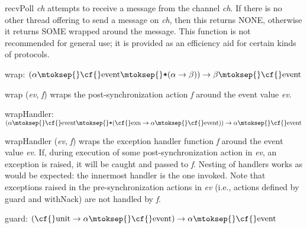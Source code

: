 \begin{descr}
\begin{speccomment}
\item {\cf \small recv\-Poll \mbox{\cf \small \textit{ch}}           } 
attempts to receive a message from the channel \mbox{\cf \small \textit{ch}}. 	  If there is no other thread offering to {\cf \small send} a message 	  on \mbox{\cf \small \textit{ch}}, then this returns 	  {\cf \small NONE}, otherwise it 	  returns {\cf \small SOME} wrapped 	  around the message. 	  This function is not recommended for general use; it is provided 	  as an efficiency aid for certain kinds of protocols.     \end{speccomment}
\item {}{} {\cf wrap: \((\alpha\mtoksep{}\mbox{\cf{}event}\mtoksep{}\verb,*,(\alpha\rightarrow \beta))\rightarrow \beta\mtoksep{}\mbox{\cf{}event}\)}\label{val-CML.wrap}


\begin{speccomment}
\item {\cf \small wrap (\mbox{\cf \small \textit{ev}}, \mbox{\cf \small \textit{f}})           } 
wraps the post-synchronization action \mbox{\cf \small \textit{f}} around the event 	  value \mbox{\cf \small \textit{ev}}.     \end{speccomment}
\item {}{} {\cf wrapHandler: \((\alpha\mtoksep{}\mbox{\cf{}event}\mtoksep{}\verb,*,(\mbox{\cf{}exn}\rightarrow \alpha\mtoksep{}\mbox{\cf{}event}))\rightarrow \alpha\mtoksep{}\mbox{\cf{}event}\)}\label{val-CML.wrapHandler}


\begin{speccomment}
\item {\cf \small wrap\-Handler (\mbox{\cf \small \textit{ev}}, \mbox{\cf \small \textit{f}})           } 
wraps the exception handler function \mbox{\cf \small \textit{f}} around the event 	  value \mbox{\cf \small \textit{ev}}. 	  If, during execution of some post-synchronization action in 	  \mbox{\cf \small \textit{ev}}, an exception is raised, it will be caught and passed 	  to \mbox{\cf \small \textit{f}}. 	  Nesting of handlers works as would be expected: the innermost 	  handler is the one invoked. 	  Note that exceptions raised in the pre-synchronization actions in 	  \mbox{\cf \small \textit{ev}} (i.\-e., actions defined by {\cf \small guard} and {\cf \small with\-Nack}) 	  are not handled by \mbox{\cf \small \textit{f}}.     \end{speccomment}
\item {}{} {\cf guard: \((\mbox{\cf{}unit}\rightarrow \alpha\mtoksep{}\mbox{\cf{}event})\rightarrow \alpha\mtoksep{}\mbox{\cf{}event}\)}\label{val-CML.guard}



\end{descr}
